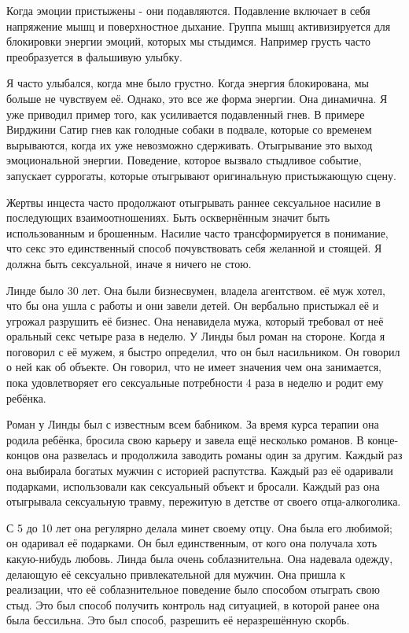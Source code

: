\documentclass[10pt, fleqn]{article}
\begin{document}
Когда эмоции пристыжены - они подавляются. Подавление включает в себя напряжение мышц и поверхностное дыхание. Группа мышц активизируется для блокировки энергии эмоций, которых мы стыдимся. Например грусть часто преобразуется в фальшивую улыбку.

Я часто улыбался, когда мне было грустно. Когда энергия блокирована, мы больше не чувствуем её. Однако, это все же форма энергии. Она динамична. Я уже приводил пример того, как усиливается подавленный гнев. В примере Вирджини Сатир гнев как голодные собаки в подвале, которые со временем вырываются, когда их уже невозможно сдерживать. Отыгрывание это выход эмоциональной энергии. Поведение, которое вызвало стыдливое событие, запускает суррогаты, которые отыгрывают оригинальную пристыжающую сцену.


Жертвы инцеста часто продолжают отыгрывать раннее сексуальное насилие в последующих взаимоотношениях. Быть осквернённым значит быть использованным и брошенным. Насилие часто трансформируется в понимание, что секс это единственный способ почувствовать себя желанной и стоящей. Я должна быть сексуальной, иначе я ничего не стою.

Линде было 30 лет. Она были бизнесвумен, владела агентством. её муж хотел, что бы она ушла с работы и они завели детей. Он вербально пристыжал её и угрожал разрушить её бизнес. Она ненавидела мужа, который требовал от неё оральный секс четыре раза в неделю. У Линды был роман на стороне. Когда я поговорил с её мужем, я быстро определил, что он был насильником. Он говорил о ней как об объекте. Он говорил, что не имеет значения чем она занимается, пока удовлетворяет его сексуальные потребности 4 раза в неделю и родит ему ребёнка.

Роман у Линды был с известным всем бабником. За время курса терапии она родила ребёнка, бросила свою карьеру и завела ещё несколько романов. В конце-концов она развелась и продолжила заводить романы один за другим. Каждый раз она выбирала богатых мужчин с историей распутства. Каждый раз её одаривали подарками, использовали как сексуальный объект и бросали. Каждый раз она отыгрывала сексуальную травму, пережитую в детстве от своего отца-алкоголика.

С 5 до 10 лет она регулярно делала минет своему отцу. Она была его любимой; он одаривал её подарками. Он был единственным, от кого она получала хоть какую-нибудь любовь. Линда была очень соблазнительна. Она надевала одежду, делающую её сексуально привлекательной для мужчин. Она пришла к реализации, что её соблазнительное поведение было способом отыграть свою стыд. Это был способ получить контроль над ситуацией, в которой ранее она была бессильна. Это был способ, разрешить её неразрешённую скорбь.
\end{document}
